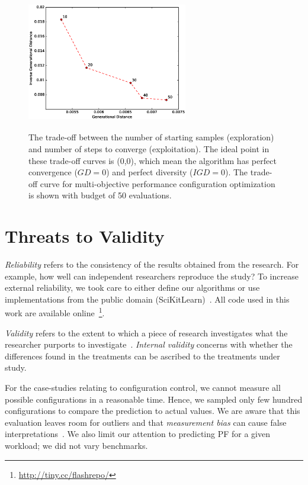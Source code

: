 \begin{figure}
\centering
\includegraphics[height=6cm,width=7cm]{Chapter-Flash/figures/tuning_1.eps}
\caption[The trade-off between the number of starting samples (exploration) and number of steps to converge (exploitation).]{The trade-off between the number of starting samples (exploration) and number of steps to converge (exploitation). The ideal point in these trade-off curves is (0,0), which mean the algorithm has perfect convergence ($GD=0$) and perfect diversity ($IGD=0$). The trade-off curve for multi-objective performance configuration optimization is shown with budget of 50 evaluations.}\label{fig:param_tuning_multiconfig}
\end{figure} 

\section{Threats to Validity}
{\em Reliability} refers to the consistency of the results obtained
from the research.  For example,   how well can independent researchers reproduce the study? To increase external
reliability, we took care to either  define our
algorithms or use implementations from the public domain
(SciKitLearn)~\cite{scikit-learn}. All code used in this work are available
online~\footnote{\url{http://tiny.cc/flashrepo/}}.

{\em Validity} refers to the extent to which a piece of research
investigates what the researcher purports to investigate~\cite{SSA15}.
{\em Internal validity} concerns with whether the differences found in
the treatments can be ascribed to the treatments under study. 

For the case-studies relating to configuration control, we cannot measure all possible configurations in a reasonable time. Hence, we sampled only few hundred configurations to compare the prediction to actual values. We are aware that this evaluation leaves room for outliers and that \textit{measurement bias} can cause false interpretations~\cite{me12d}. We also limit our attention to predicting PF for a given workload; we did not vary benchmarks.

